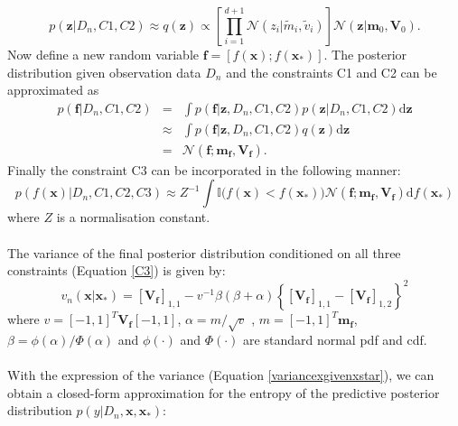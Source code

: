 \documentclass[a4paper,11pt]{report}
\begin{document}
	\begin{equation} 
	p( \mathbf{z} \vert D_n, C1, C2 ) \approx q(\mathbf{z}) \propto \left[  \prod_{i=1}^{d+1} \mathcal{N} (z_i \vert \tilde m_i, \tilde v_i )\right] \mathcal{N} ( \mathbf{z} \vert \mathbf{m}_0,  \mathbf{V}_0).
	\end{equation} 
Now define a new random variable $ \mathbf{f} = [ f(\mathbf{x}) ; f(\mathbf{x}_{*})] $. The posterior distribution given observation data $D_n$ and the constraints C1 and C2 can be approximated as
	\begin{eqnarray} \label{posteriorC1C2}
	p(\mathbf{f} \vert D_n, C1, C2 ) &=& \int p(\mathbf{f} \vert \mathbf{z}, D_n, C1, C2 ) p( \mathbf{z} \vert D_n, C1, C2 ) \mathrm{d} \mathbf{z}   
	\\&\approx&  \int p(\mathbf{f} \vert \mathbf{z}, D_n, C1, C2 ) q( \mathbf{z} ) \mathrm{d} \mathbf{z} 
	\\&=& \mathcal{N} ( \mathbf{f} ; \mathbf{m}_{\mathbf{f}}, \mathbf{V}_{\mathbf{f}}).
	\end{eqnarray}
Finally the constraint C3 can be incorporated in the following manner:
	 \begin{equation} \label{C3}
	p( f(\mathbf{x}) \vert D_n, C1, C2, C3 )  \approx Z^{-1} \int \mathbb{I} \big( f(\mathbf{x}) < f(\mathbf{x}_{*}) \big)  \mathcal{N} ( \mathbf{f} ; \mathbf{m}_{\mathbf{f}}, \mathbf{V}_{\mathbf{f}}) \mathrm{d} f(\mathbf{x}_{*})
		\end{equation}
where $Z$ is a normalisation constant. 
\\\\
The variance of the final posterior distribution conditioned on all three constraints (Equation \ref{C3}) is given by: 
	\begin{equation} \label{variancexgivenxstar}
	v_n( \mathbf{x} \vert \mathbf{x}_*) = [\mathbf{V}_{\mathbf{f}}]_{1,1} - v^{-1} \beta (\beta +\alpha) \left \{  [\mathbf{V}_{\mathbf{f}}]_{1,1} -  [\mathbf{V}_{\mathbf{f}}]_{1,2} \right \}^2
	\end{equation}
where $v=[-1,1]^T\mathbf{V}_{\mathbf{f}} [-1, 1] $,  $\alpha = m / \sqrt{v}$ , $m=[-1,1]^T\mathbf{m}_{\mathbf{f}}$, $\beta = \phi(\alpha) / \Phi(\alpha)$ and $\phi(\cdot)$ and $\Phi(\cdot)$ are standard normal pdf and cdf. 
\\\\
With the expression of the variance (Equation \ref{variancexgivenxstar}), we can obtain a closed-form approximation for the entropy of the predictive posterior distribution $ p (y \vert D_n, \mathbf{x}, \mathbf{x}_*) $: 
\end{document}
